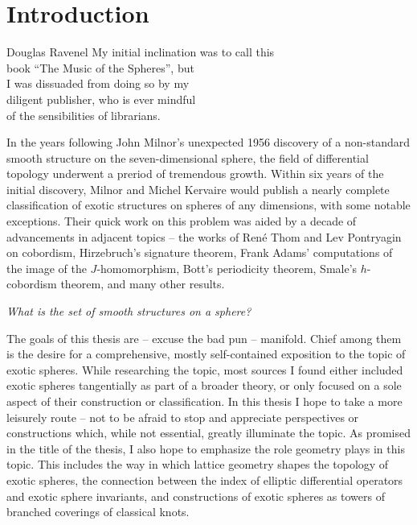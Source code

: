 \chapter{Introduction}\label{chap:introduction}

\begin{epigraph}{17em}{Douglas Ravenel}
  My initial inclination was to call this\\
  book ``The Music of the Spheres'', but\\
  I was dissuaded from doing so by my \\
  diligent publisher, who is ever mindful \\
  of the sensibilities of librarians.
\end{epigraph}

In the years following John Milnor's unexpected 1956 discovery of a non-standard smooth structure on the seven-dimensional sphere, the field of differential topology underwent a preriod of tremendous growth. Within six years of the initial discovery, Milnor and Michel Kervaire would publish a nearly complete classification of exotic structures on spheres of any dimensions, with some notable exceptions. 
Their quick work on this problem was aided by a decade of advancements in adjacent topics -- the works of Ren\'e Thom and Lev Pontryagin on cobordism, Hirzebruch's signature theorem, Frank Adams' computations of the image of the $J$-homomorphism, Bott's periodicity theorem, Smale's $h$-cobordism theorem, and many other results. 


\begin{center}
  \textsl{What is the set of smooth structures on a sphere?}
\end{center}

The goals of this thesis are -- excuse the bad pun -- manifold. Chief among them is the desire for a comprehensive, mostly self-contained exposition to the topic of exotic spheres. While researching the topic, most sources I found either included exotic spheres tangentially as part of a broader theory, or only focused on a sole aspect of their construction or classification.
In this thesis I hope to take a more leisurely route -- not to be afraid to stop and appreciate perspectives or constructions which, while not essential, greatly illuminate the topic.
As promised in the title of the thesis, I also hope to emphasize the role geometry plays in this topic.
This includes the way in which lattice geometry shapes the topology of exotic spheres, the connection between the index of elliptic differential operators and exotic sphere invariants, and constructions of exotic spheres as towers of branched coverings of classical knots. 

